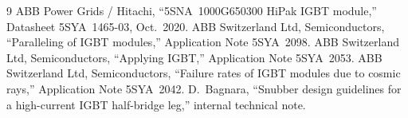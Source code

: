 \documentclass[11pt,a4paper]{article}
\begin{document}
\begin{thebibliography}{9}
 ABB Power Grids / Hitachi, ``5SNA~1000G650300 HiPak IGBT module,''
Datasheet 5SYA~1465-03, Oct.~2020.
 ABB Switzerland Ltd, Semiconductors, ``Paralleling of IGBT modules,''
Application Note 5SYA~2098.
 ABB Switzerland Ltd, Semiconductors, ``Applying IGBT,''
Application Note 5SYA~2053.
 ABB Switzerland Ltd, Semiconductors, ``Failure rates of IGBT modules
due to cosmic rays,'' Application Note 5SYA~2042.
 D.~Bagnara, ``Snubber design guidelines for a high-current IGBT
half-bridge leg,'' internal technical note.
\end{thebibliography}
\end{document}
